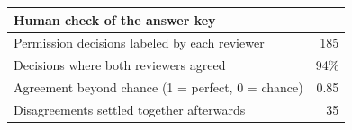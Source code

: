\begin{tabular}{lr}
\toprule
Human check of the answer key &  \\
\midrule
Permission decisions labeled by each reviewer & 185 \\
Decisions where both reviewers agreed & 94\% \\
Agreement beyond chance (1 = perfect, 0 = chance) & 0.85 \\
Disagreements settled together afterwards & 35 \\
\bottomrule
\end{tabular}
